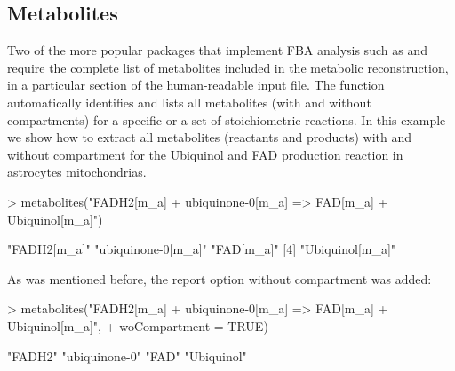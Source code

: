 \subsection{Metabolites}
Two of the more popular packages that implement FBA analysis such as  \citep{Becker2007} and  \citep{Agren2013} require the complete list of metabolites included in the metabolic reconstruction, in a particular section of the human-readable input file. The  function automatically identifies and lists  all metabolites (with and without compartments) for a specific or a set of stoichiometric reactions.  In this example we show how to extract all metabolites (reactants and products) with and without compartment for the Ubiquinol and FAD production reaction in astrocytes mitochondrias.
\begin{Schunk}
\begin{Sinput}
> metabolites("FADH2[m_a] + ubiquinone-0[m_a] => FAD[m_a] + Ubiquinol[m_a]")
\end{Sinput}
\begin{Soutput}
[1] "FADH2[m_a]"        "ubiquinone-0[m_a]" "FAD[m_a]"         
[4] "Ubiquinol[m_a]"   
\end{Soutput}
As was mentioned before, the report option without compartment was added:
\begin{Sinput}
> metabolites("FADH2[m_a] + ubiquinone-0[m_a] => FAD[m_a] + Ubiquinol[m_a]",
+             woCompartment = TRUE)
\end{Sinput}
\begin{Soutput}
[1] "FADH2"        "ubiquinone-0" "FAD"          "Ubiquinol"   
\end{Soutput}
\end{Schunk}
